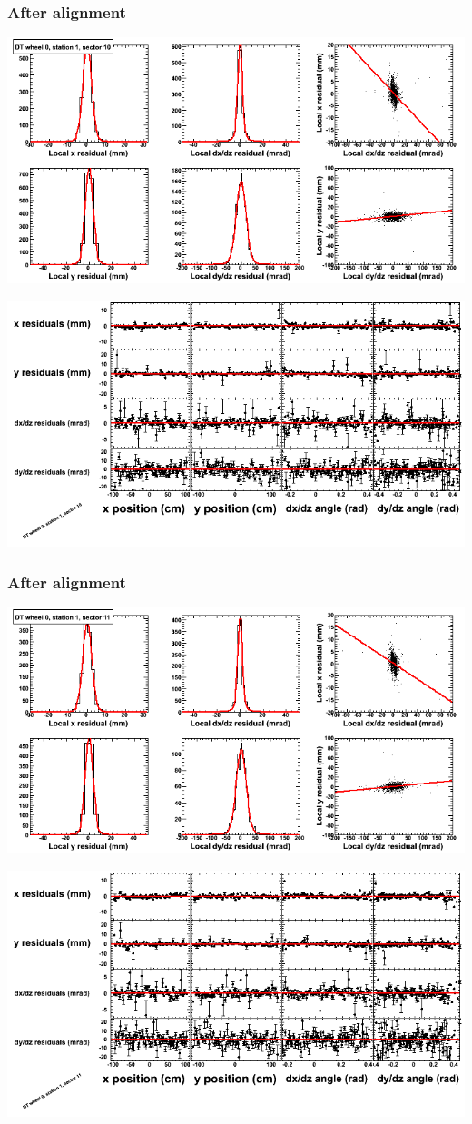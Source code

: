 \documentclass[compress]{beamer}
\begin{document}
\begin{frame}
\frametitle{After alignment}
\includegraphics[width=0.7\linewidth]{NOV4_fitfunctions/MBwhCst1sec10_bellcurves.png}

\includegraphics[width=0.7\linewidth]{NOV4_fitfunctions/MBwhCst1sec10_polynomials.png}
\end{frame}

\begin{frame}
\frametitle{After alignment}
\includegraphics[width=0.7\linewidth]{NOV4_fitfunctions/MBwhCst1sec11_bellcurves.png}

\includegraphics[width=0.7\linewidth]{NOV4_fitfunctions/MBwhCst1sec11_polynomials.png}
\end{frame}
\end{document}
